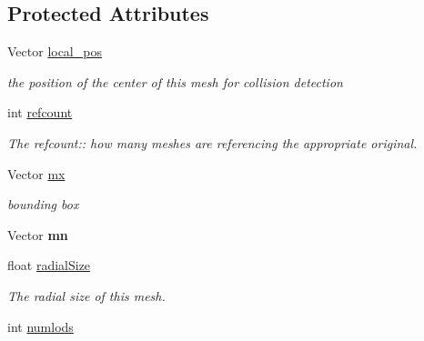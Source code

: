 \subsection*{Protected Attributes}
\begin{DoxyCompactItemize}
\item 
Vector \hyperlink{classMesh_a1c064ee7c04876544602c7c1bf95b6af}{local\+\_\+pos}\hypertarget{classMesh_a1c064ee7c04876544602c7c1bf95b6af}{}\label{classMesh_a1c064ee7c04876544602c7c1bf95b6af}

\begin{DoxyCompactList}\small\item\em the position of the center of this mesh for collision detection \end{DoxyCompactList}\item 
int \hyperlink{classMesh_a7e626b3e0ee42a6bc401d1af3e1d3ef5}{refcount}\hypertarget{classMesh_a7e626b3e0ee42a6bc401d1af3e1d3ef5}{}\label{classMesh_a7e626b3e0ee42a6bc401d1af3e1d3ef5}

\begin{DoxyCompactList}\small\item\em The refcount\+:\+: how many meshes are referencing the appropriate original. \end{DoxyCompactList}\item 
Vector \hyperlink{classMesh_a2732fc31d4d22180fa07d2c19b72b83d}{mx}\hypertarget{classMesh_a2732fc31d4d22180fa07d2c19b72b83d}{}\label{classMesh_a2732fc31d4d22180fa07d2c19b72b83d}

\begin{DoxyCompactList}\small\item\em bounding box \end{DoxyCompactList}\item 
Vector {\bfseries mn}\hypertarget{classMesh_a5d825c3b5d3c54d72a3806ee0eddb24c}{}\label{classMesh_a5d825c3b5d3c54d72a3806ee0eddb24c}

\item 
float \hyperlink{classMesh_aa4f806730478c523b93715acc9be8dd4}{radial\+Size}\hypertarget{classMesh_aa4f806730478c523b93715acc9be8dd4}{}\label{classMesh_aa4f806730478c523b93715acc9be8dd4}

\begin{DoxyCompactList}\small\item\em The radial size of this mesh. \end{DoxyCompactList}\item 
int \hyperlink{classMesh_a4a0649c4c4dfe2473400f9df85fc1206}{numlods}\hypertarget{classMesh_a4a0649c4c4dfe2473400f9df85fc1206}{}\label{classMesh_a4a0649c4c4dfe2473400f9df85fc1206}


\end{DoxyCompactItemize}
